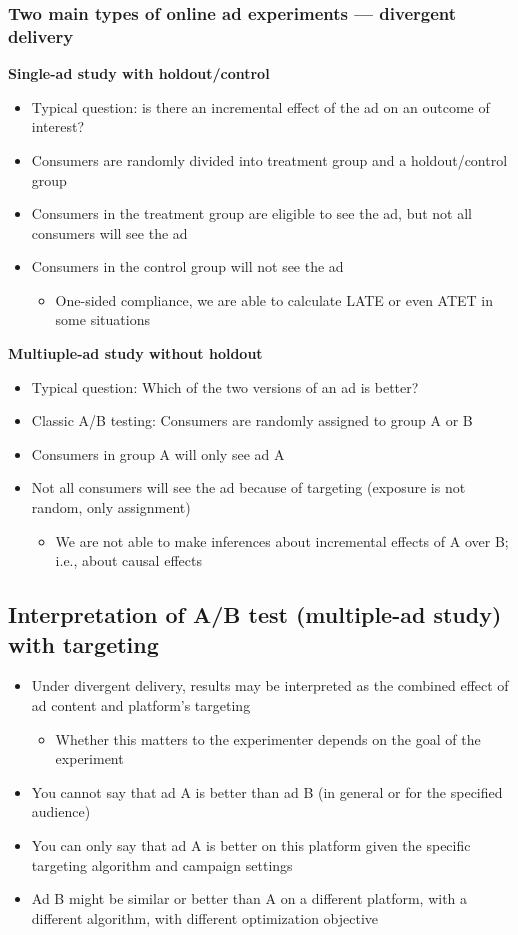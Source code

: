 \documentclass[10pt]{article}
\begin{document}
\subsubsection{Two main types of online ad experiments --- divergent delivery}
\textbf{Single-ad study with holdout/control}
\begin{itemize}
    \item Typical question: is there an incremental effect of the ad on an outcome of interest?
    \item Consumers are randomly divided into treatment group and a holdout/control group 
    \item Consumers in the treatment group are eligible to see the ad, but not all consumers will see the ad 
    \item Consumers in the control group will not see the ad 
    \begin{itemize}
        \item One-sided compliance, we are able to calculate LATE or even ATET in some situations 
    \end{itemize}
\end{itemize}
\textbf{Multiuple-ad study without holdout}
\begin{itemize}
    \item Typical question: Which of the two versions of an ad is better?
    \item Classic A/B testing: Consumers are randomly assigned to group A or B
    \item Consumers in group A will only see ad A
    \item Not all consumers will see the ad because of targeting (exposure is not random, only assignment)
    \begin{itemize}
        \item We are not able to make inferences about incremental effects of A over B; i.e., about causal effects
    \end{itemize}
\end{itemize}
\newpage 
\subsection{Interpretation of A/B test (multiple-ad study) with targeting}
\begin{itemize}
    \item Under divergent delivery, results may be interpreted as the combined effect of ad content and platform's targeting 
    \begin{itemize}
        \item Whether this matters to the experimenter depends on the goal of the experiment 
    \end{itemize}
    \item You cannot say that ad A is better than ad B (in general or for the specified audience)
    \item You can only say that ad A is better on this platform given the specific targeting algorithm and campaign settings
    \item Ad B might be similar or better than A on a different platform, with a different algorithm, with different optimization objective
\end{itemize}
\end{document}
